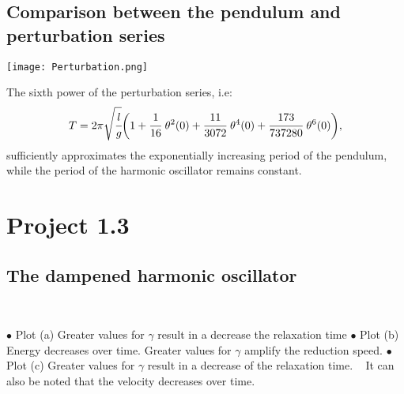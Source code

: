 \documentclass[12pt]{article}
\begin{document}
\subsection*{Comparison between the pendulum and perturbation series}
\begin{figure*}[ht!]
\begin{center}
    \texttt{[image: Perturbation.png]}
 \caption{}
\end{center}
\end{figure*}
\noindent The sixth power of the perturbation series, i.e:
\begin{equation*}
T = 2\pi\sqrt{\cfrac{l}{g}}\bigg(1 + \cfrac{1}{16}\text{ }\theta^2(0) + \cfrac{11}{3072}\text{ }\theta^4(0) + \cfrac{173}{737280}\text{ }\theta^6(0)\bigg),  
\end{equation*}
\noindent sufficiently approximates the exponentially increasing period of the pendulum, while the period of the harmonic oscillator remains constant.

\newpage
\section*{Project 1.3}
\subsection*{The dampened harmonic oscillator}
\begin{figure*}[ht!]
\begin{center}
   \\
   \caption{\label{workflow} (a) Position over time; 
   (b) Energy over time; 
   (c) Velocity over time.}
\end{center}
\end{figure*}
\noindent $\bullet$ Plot (a) Greater values for $\gamma$ result in a decrease the relaxation time 
\vspace{0.2cm}
\newline
\noindent $\bullet$ Plot (b) Energy decreases over time. Greater values for $\gamma$ amplify the reduction speed.
\vspace{0.2cm}
\newline
\noindent $\bullet$ Plot (c) Greater values for $\gamma$ result in a decrease of the relaxation time. 
\newline 
\textcolor{white}o It can also be noted that the velocity decreases over time.
\end{document}
